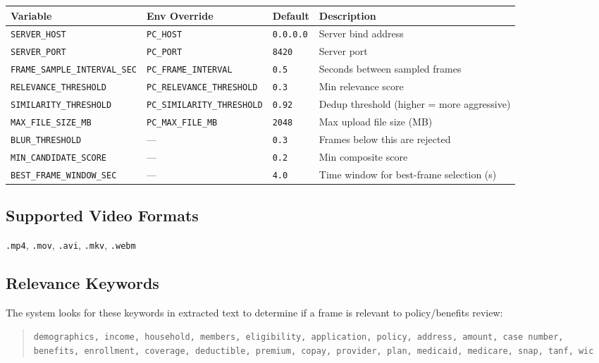 \documentclass[12pt, a4paper]{article}
\newcommand{\codeinline}[1]{\texttt{\small\colorbox{codebg}{#1}}}
\begin{document}
\begin{longtable}{@{} p{3.8cm} p{3.2cm} l p{4.5cm} @{}}
    \toprule
    \textbf{Variable} & \textbf{Env Override} & \textbf{Default} & \textbf{Description} \\
    \midrule
    \endhead
    \codeinline{SERVER\_HOST} & \codeinline{PC\_HOST} & \codeinline{0.0.0.0} & Server bind address \\
    \codeinline{SERVER\_PORT} & \codeinline{PC\_PORT} & \codeinline{8420} & Server port \\
    \codeinline{FRAME\_SAMPLE\_INTERVAL\_SEC} & \codeinline{PC\_FRAME\_INTERVAL} & \codeinline{0.5} & Seconds between sampled frames \\
    \codeinline{RELEVANCE\_THRESHOLD} & \codeinline{PC\_RELEVANCE\_THRESHOLD} & \codeinline{0.3} & Min relevance score \\
    \codeinline{SIMILARITY\_THRESHOLD} & \codeinline{PC\_SIMILARITY\_THRESHOLD} & \codeinline{0.92} & Dedup threshold (higher = more aggressive) \\
    \codeinline{MAX\_FILE\_SIZE\_MB} & \codeinline{PC\_MAX\_FILE\_MB} & \codeinline{2048} & Max upload file size (MB) \\
    \codeinline{BLUR\_THRESHOLD} & --- & \codeinline{0.3} & Frames below this are rejected \\
    \codeinline{MIN\_CANDIDATE\_SCORE} & --- & \codeinline{0.2} & Min composite score \\
    \codeinline{BEST\_FRAME\_WINDOW\_SEC} & --- & \codeinline{4.0} & Time window for best-frame selection (s) \\
    \bottomrule
\end{longtable}

\subsection{Supported Video Formats}

\codeinline{.mp4}, \codeinline{.mov}, \codeinline{.avi}, \codeinline{.mkv}, \codeinline{.webm}

\subsection{Relevance Keywords}

The system looks for these keywords in extracted text to determine if a frame is relevant to policy/benefits review:

\begin{quote}
\texttt{demographics, income, household, members, eligibility, application, policy, address, amount, case number, benefits, enrollment, coverage, deductible, premium, copay, provider, plan, medicaid, medicare, snap, tanf, wic}
\end{quote}
\end{document}
